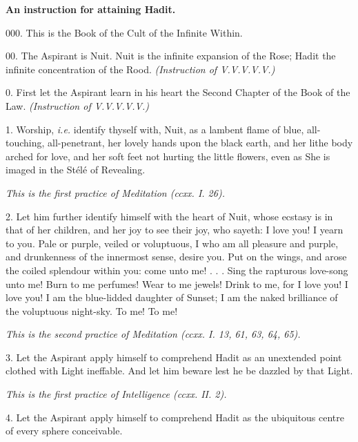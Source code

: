 

\textbf{An instruction for attaining Hadit.}

000. This is the Book of the Cult of the Infinite Within.

00. The Aspirant is Nuit. Nuit is the infinite expansion of the Rose; Hadit the infinite concentration of the Rood. \textit{(Instruction of V.V.V.V.V.)}

0. First let the Aspirant learn in his heart the Second Chapter of the Book of the Law. \textit{(Instruction of V.V.V.V.V.)}

1. Worship, \textit{i.e.} identify thyself with, Nuit, as a lambent flame of blue, all-touching, all-penetrant, her lovely hands upon the black earth, and her lithe body arched for love, and her soft feet not hurting the little flowers, even as She is imaged in the St\'{e}l\'{e} of Revealing.

\textit{This is the first practice of Meditation (ccxx. I. 26).}

2. Let him further identify himself with the heart of Nuit, whose ecstasy is in that of her children, and her joy to see their joy, who sayeth: I love you! I yearn to you. Pale or purple, veiled or voluptuous, I who am all pleasure and purple, and drunkenness of the innermost sense, desire you. Put on the wings, and arose the coiled splendour within you: come unto me! . . . Sing the rapturous love-song unto me! Burn to me perfumes! Wear to me jewels! Drink to me, for I love you! I love you! I am the blue-lidded daughter of Sunset; I am the naked brilliance of the voluptuous night-sky. To me! To me!

\textit{This is the second practice of Meditation (ccxx. I. 13, 61, 63, 64, 65).}

3. Let the Aspirant apply himself to comprehend Hadit as an unextended point clothed with Light ineffable. And let him beware lest he be dazzled by that Light.

\textit{This is the first practice of Intelligence (ccxx. II. 2).}

4. Let the Aspirant apply himself to comprehend Hadit as the ubiquitous centre of every sphere conceivable.

